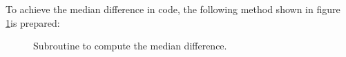 To achieve the median difference in code, the following method shown in figure \ref{fig:med}is prepared:
\begin{figure}[H]
	\centering
	\caption{Subroutine to compute the median difference.}
	\label{fig:med}
\end{figure}
